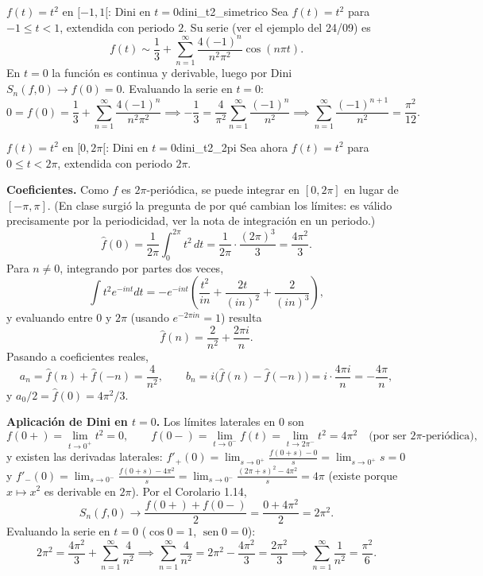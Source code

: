 \begin{ejemplo}{$f(t)=t^2$ en $[-1,1[$: Dini en $t=0$}{dini_t2_simetrico}
Sea $f(t) = t^2$ para $-1 \le t < 1$, extendida con periodo $2$. Su serie (ver el ejemplo del 24/09) es
\[
f(t) \sim \frac{1}{3} + \sum_{n=1}^\infty \frac{4(-1)^n}{n^2\pi^2} \cos(n\pi t).
\]
En $t=0$ la función es continua y derivable, luego por Dini $S_n(f,0) \to f(0) = 0$. Evaluando la serie en $t=0$:
\[
0 = f(0) = \frac{1}{3} + \sum_{n=1}^\infty \frac{4(-1)^n}{n^2\pi^2} \implies -\frac{1}{3} = \frac{4}{\pi^2}\sum_{n=1}^\infty \frac{(-1)^n}{n^2} \implies \sum_{n=1}^\infty \frac{(-1)^{n+1}}{n^2} = \frac{\pi^2}{12}.
\]
\end{ejemplo}

\begin{ejemplo}{$f(t)=t^2$ en $[0,2\pi[$: Dini en $t=0$}{dini_t2_2pi}
Sea ahora $f(t) = t^2$ para $0 \le t < 2\pi$, extendida con periodo $2\pi$.

\textbf{Coeficientes.} Como $f$ es $2\pi$-periódica, se puede integrar en $[0,2\pi]$ en lugar de $[-\pi,\pi]$. (En clase surgió la pregunta de por qué cambian los límites: es válido precisamente por la periodicidad, ver la nota de integración en un periodo.)
\[
\hat{f}(0) = \frac{1}{2\pi} \int_0^{2\pi} t^2 \, dt = \frac{1}{2\pi} \cdot \frac{(2\pi)^3}{3} = \frac{4\pi^2}{3}.
\]
Para $n \ne 0$, integrando por partes dos veces,
\[
\int t^2 e^{-int} dt = -e^{-int}\left( \frac{t^2}{in} + \frac{2t}{(in)^2} + \frac{2}{(in)^3} \right),
\]
y evaluando entre $0$ y $2\pi$ (usando $e^{-2\pi i n} = 1$) resulta
\[
\hat{f}(n) = \frac{2}{n^2} + \frac{2\pi i}{n}.
\]
Pasando a coeficientes reales,
\[
a_n = \hat{f}(n) + \hat{f}(-n) = \frac{4}{n^2}, \qquad b_n = i\big(\hat{f}(n) - \hat{f}(-n)\big) = i \cdot \frac{4\pi i}{n} = -\frac{4\pi}{n},
\]
y $a_0/2 = \hat{f}(0) = 4\pi^2/3$.

\textbf{Aplicación de Dini en $t=0$.} Los límites laterales en $0$ son
\[
f(0+) = \lim_{t \to 0^+} t^2 = 0, \qquad f(0-) = \lim_{t \to 0^-} f(t) = \lim_{t \to 2\pi^-} t^2 = 4\pi^2 \quad \text{(por ser $2\pi$-periódica)},
\]
y existen las derivadas laterales:
$f'_+(0) = \lim_{s \to 0^+} \frac{f(0+s)-0}{s} = \lim_{s\to 0^+} s = 0$ y
$f'_-(0) = \lim_{s \to 0^-} \frac{f(0+s) - 4\pi^2}{s} = \lim_{s\to 0^-} \frac{(2\pi+s)^2 - 4\pi^2}{s} = 4\pi$
(existe porque $x \mapsto x^2$ es derivable en $2\pi$). Por el Corolario 1.14,
\[
S_n(f,0) \to \frac{f(0+) + f(0-)}{2} = \frac{0 + 4\pi^2}{2} = 2\pi^2.
\]
Evaluando la serie en $t=0$ ($\cos 0 = 1$, $\operatorname{sen} 0 = 0$):
\[
2\pi^2 = \frac{4\pi^2}{3} + \sum_{n=1}^\infty \frac{4}{n^2} \implies \sum_{n=1}^\infty \frac{4}{n^2} = 2\pi^2 - \frac{4\pi^2}{3} = \frac{2\pi^2}{3} \implies \sum_{n=1}^\infty \frac{1}{n^2} = \frac{\pi^2}{6}.
\]
\end{ejemplo}

